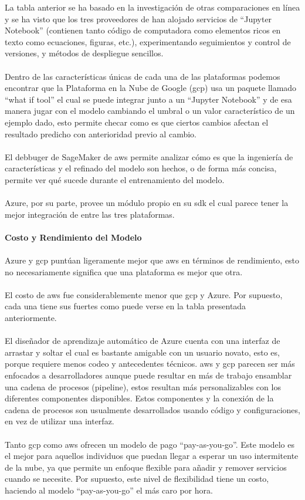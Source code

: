 \documentclass[12pt, a4paper, titlepage]{report}
\begin{document}
		\newpage
			La tabla anterior se ha basado en la investigación de otras comparaciones en línea \cite{comparing-google-cloud-platform-aws-and-azure} y se ha visto que los tres proveedores de han alojado servicios de “Jupyter Notebook” (contienen tanto código de computadora como elementos ricos en texto como ecuaciones, figuras, etc.), experimentando seguimientos y control de versiones, y métodos de despliegue sencillos.\\
		\\
		Dentro de las características únicas de cada una de las plataformas podemos encontrar que la Plataforma en la Nube de Google (\acrshort{gcp}) usa un paquete llamado “what if tool” el cual se puede integrar junto a un “Jupyter Notebook” y de esa manera jugar con el modelo cambiando el umbral o un valor característico de un ejemplo dado, esto permite checar como es que ciertos cambios afectan el resultado predicho con anterioridad previo al cambio.\\
		\\
		El debbuger de SageMaker de \acrshort{aws} permite analizar cómo es que la ingeniería de características y el refinado del modelo son hechos, o de forma más concisa, permite ver qué sucede durante el entrenamiento del modelo.\\
		\\
		Azure, por su parte, provee un módulo propio en su \acrshort{sdk} el cual parece tener la mejor integración de entre las tres plataformas.\\
		\\
		\textbf{Costo y Rendimiento del Modelo}\\
		\\
		Azure y \acrshort{gcp} puntúan ligeramente mejor que \acrshort{aws} en términos de rendimiento, esto no necesariamente significa que una plataforma es mejor que otra.\\
		\\
		El costo de \acrshort{aws} fue considerablemente menor que \acrshort{gcp} y Azure. Por supuesto, cada una tiene sus fuertes como puede verse en la tabla presentada anteriormente.\\
		\\
		El diseñador de aprendizaje automático de Azure cuenta con una interfaz de arrastar y soltar el cual es bastante amigable con un usuario novato, esto es, porque requiere menos codeo y antecedentes técnicos. \acrshort{aws} y \acrshort{gcp} parecen ser más enfocados a desarrolladores aunque puede resultar en más de trabajo ensamblar una cadena de procesos (pipeline), estos resultan más personalizables con los diferentes componentes disponibles. Estos componentes y la conexión de la cadena de procesos son usualmente desarrollados usando código y configuraciones, en vez de utilizar una interfaz.\\
		\\
		Tanto \acrshort{gcp} como \acrshort{aws} ofrecen un modelo de pago “pay-as-you-go”. Este modelo es el mejor para aquellos individuos que puedan llegar a esperar un uso intermitente de la nube, ya que permite un enfoque flexible para añadir y remover servicios cuando se necesite. Por supuesto, este nivel de flexibilidad tiene un costo, haciendo al modelo “pay-as-you-go” el más caro por hora.
		
\end{document}
